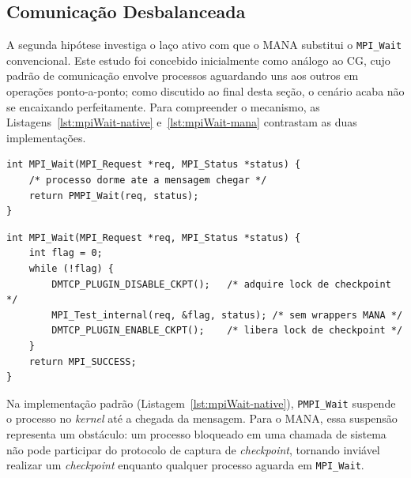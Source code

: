 \subsection{Comunicação Desbalanceada}
\label{sec:sintetico-imbalanced}

A segunda hipótese investiga o laço ativo com que o MANA substitui o \texttt{MPI\_Wait}
convencional. Este estudo foi concebido inicialmente como análogo ao CG, cujo padrão de
comunicação envolve processos aguardando uns aos outros em operações ponto-a-ponto; como
discutido ao final desta seção, o cenário acaba não se encaixando perfeitamente. Para
compreender o mecanismo, as Listagens~\ref{lst:mpiWait-native}
e~\ref{lst:mpiWait-mana} contrastam as duas implementações.

\begin{listing}[htb]
  \caption{\texttt{MPI\_Wait} padrão: processo suspende no \textit{kernel} até
           a mensagem chegar.}
  \label{lst:mpiWait-native}
  \begin{verbatim}
int MPI_Wait(MPI_Request *req, MPI_Status *status) {
    /* processo dorme ate a mensagem chegar */
    return PMPI_Wait(req, status);
}
  \end{verbatim}
\end{listing}

\begin{listing}[htb]
  \caption{\texttt{MPI\_Wait} no MANA (simplificado): laço ativo com janelas de
           \textit{checkpoint}.}
  \label{lst:mpiWait-mana}
  \begin{verbatim}
int MPI_Wait(MPI_Request *req, MPI_Status *status) {
    int flag = 0;
    while (!flag) {
        DMTCP_PLUGIN_DISABLE_CKPT();   /* adquire lock de checkpoint */
        MPI_Test_internal(req, &flag, status); /* sem wrappers MANA */
        DMTCP_PLUGIN_ENABLE_CKPT();    /* libera lock de checkpoint */
    }
    return MPI_SUCCESS;
}
  \end{verbatim}
\end{listing}

Na implementação padrão (Listagem~\ref{lst:mpiWait-native}), \texttt{PMPI\_Wait}
suspende o processo no \textit{kernel} até a chegada da mensagem. Para o MANA, essa
suspensão representa um obstáculo: um processo bloqueado em uma chamada de sistema não
pode participar do protocolo de captura de \textit{checkpoint}, tornando inviável
realizar um \textit{checkpoint} enquanto qualquer processo aguarda em
\texttt{MPI\_Wait}.

